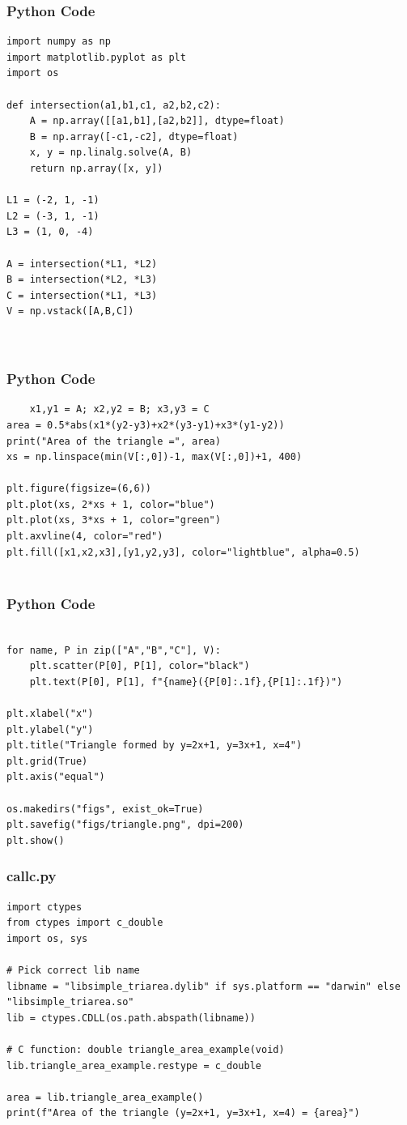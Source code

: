 \documentclass{beamer}
\begin{document}
\begin{frame}[fragile]
\frametitle{Python Code}
\begin{lstlisting}
import numpy as np
import matplotlib.pyplot as plt
import os

def intersection(a1,b1,c1, a2,b2,c2):
    A = np.array([[a1,b1],[a2,b2]], dtype=float)
    B = np.array([-c1,-c2], dtype=float)
    x, y = np.linalg.solve(A, B)
    return np.array([x, y])

L1 = (-2, 1, -1)
L2 = (-3, 1, -1)
L3 = (1, 0, -4)

A = intersection(*L1, *L2)
B = intersection(*L2, *L3)
C = intersection(*L1, *L3)
V = np.vstack([A,B,C])



    \end{lstlisting}
\end{frame}

\begin{frame}[fragile]
    \frametitle{Python Code}
    \begin{lstlisting}
    x1,y1 = A; x2,y2 = B; x3,y3 = C
area = 0.5*abs(x1*(y2-y3)+x2*(y3-y1)+x3*(y1-y2))
print("Area of the triangle =", area)
xs = np.linspace(min(V[:,0])-1, max(V[:,0])+1, 400)

plt.figure(figsize=(6,6))
plt.plot(xs, 2*xs + 1, color="blue")
plt.plot(xs, 3*xs + 1, color="green")
plt.axvline(4, color="red")
plt.fill([x1,x2,x3],[y1,y2,y3], color="lightblue", alpha=0.5)


    \end{lstlisting}
\end{frame}

 \begin{frame}[fragile]
    \frametitle{ Python Code}
    \begin{lstlisting}
   
for name, P in zip(["A","B","C"], V):
    plt.scatter(P[0], P[1], color="black")
    plt.text(P[0], P[1], f"{name}({P[0]:.1f},{P[1]:.1f})")

plt.xlabel("x")
plt.ylabel("y")
plt.title("Triangle formed by y=2x+1, y=3x+1, x=4")
plt.grid(True)
plt.axis("equal")

os.makedirs("figs", exist_ok=True)
plt.savefig("figs/triangle.png", dpi=200)
plt.show()

\end{lstlisting}
\end{frame}

\begin{frame}[fragile]
\frametitle{callc.py}
    \begin{lstlisting}    
import ctypes
from ctypes import c_double
import os, sys

# Pick correct lib name
libname = "libsimple_triarea.dylib" if sys.platform == "darwin" else "libsimple_triarea.so"
lib = ctypes.CDLL(os.path.abspath(libname))

# C function: double triangle_area_example(void)
lib.triangle_area_example.restype = c_double

area = lib.triangle_area_example()
print(f"Area of the triangle (y=2x+1, y=3x+1, x=4) = {area}")

    \end{lstlisting}
\end{frame}
\end{document}
